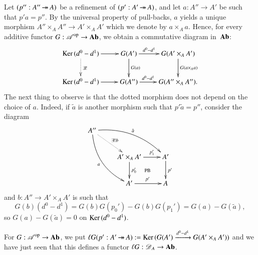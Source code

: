 \documentclass[1p]{elsarticle}
\theoremstyle{mythm}
\theoremstyle{mydef}
\begin{document}
Let $(p'': A'' \operatorname{\twoheadrightarrow} A)$ be a
refinement of $(p': A' \operatorname{\twoheadrightarrow} A)$, and let $a : A'' \to A'$ be such that 
$p'a = p''$. By the universal property of pull-backs, $a$ yields a
unique morphism $A'' \times_{A} A'' \to A' \times_{A} A'$ which we
denote by $a \times_{A} a$. Hence, for every
additive functor $G: \operatorname{\mathscr{A}}^{\operatorname{op}} \to \operatorname{\mathbf{Ab}}$, we
obtain a commutative diagram in~$\operatorname{\mathbf{Ab}}$:
\[
\xymatrix{
  \Ker{(d^{0} - d^{1})} \ar@{.>}[d]^{\exists!} \ar[r] &
  G(A') \ar[r]^-{d^{0} - d^{1}} \ar[d]^{G{(a)}} & 
  G(A' \times_{A} A') \ar[d]^{G(a \times_A a)} \\
  \Ker{(d^{0} - d^{1})} \ar[r] &
  G(A'') \ar[r]^-{d^{0} - d^{1}} & 
  G(A'' \times_{A} A'').
}
\]
The next thing to observe is that the dotted morphism does not depend
on the choice of $a$. Indeed, if $\tilde{a}$ is another morphism such that
$p' \tilde{a} = p''$, consider the diagram
\[
\xymatrix{
  A''  \ar@/_1.2pc/[ddr]_-{a} \ar@/^1.2pc/[drr]^-{\tilde{a}} 
  \ar@{.>}[dr]^{\exists! b} \\
  & A' \times_{A} A' \ar[r]^-{p_{1}'} \ar[d]^-{p_{0}'}
  \ar@{}[dr]|{\text{PB}} & A' \ar[d]^{p'}
  \\
  & A' \ar[r]^{p'} & A   
}
\]
and $b: A'' \to A' \times_{A} A'$ is such that
\[
G(b) (d^{0} - d^{1}) = G(b) G(p_0') - G(b) G(p_1') = G(a) - G(\tilde{a}),
\]
so 
$G(a) - G(\tilde{a}) = 0$ on $\operatorname{Ker}{(d^{0} - d^{1})}$.

For $G: \operatorname{\mathscr{A}}^{\operatorname{op}} \to \operatorname{\mathbf{Ab}}$, we
put $\ell G(p': A' \operatorname{\twoheadrightarrow} A) :=
\operatorname{Ker}{(G(A') \xrightarrow{d^{0} - d^{1}} G(A' \times_{A} A'))}$ and we
have just seen that this
defines a functor $\ell G: \operatorname{\mathscr{D}}_{A} \to \operatorname{\mathbf{Ab}}$.
\end{document}
